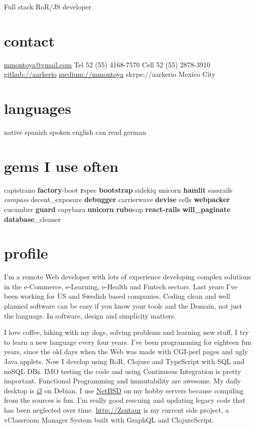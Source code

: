 \documentclass[]{k-cv}
\begin{document}
       {Full stack RoR/JS developer}

\begin{aside}
  \section{contact}
    \href{mailto:mmontoya@gmail.com}{mmontoya@gmail.com}
    Tel  52 (55) 4168-7570
    Cell 52 (55) 2878-3910
    \href{http://github.com/aarkerio}{github://aarkerio}
    \href{https://medium.com/@mmontoya}{medium://mmontoya}
    skype://aarkerio
    Mexico City
  \section{languages}
    native spanish
	  spoken english
	  can read german

  \section{gems I use often}
    capistrano \textbf{factory}-boot \textbf{r}spec
    \textbf{bootstrap} sidekiq unicorn \textbf{hamlit} sassrails \textit{compass}
    decent\_exposure \textbf{debugger} carrierwave \textbf{devise} cells \textbf{webpacker}
    cucumber \textbf{guard} capybara \textbf{unicorn}
    \textbf{rubo}cop \textbf{react-rails}
    \textbf{will\_paginate} \textbf{database}\_cleaner

\end{aside}

\section{profile}

I'm a remote Web developer with lots of experience developing complex solutions in the e-Commerce, e-Learning, e-Health and Fintech sectors.
Last years I've been working for US and Swedish based companies. Coding clean and well planned software can be easy if you know your tools and the Domain,
not just the language. In software, design and simplicity matters.

I love coffee, hiking with my dogs, solving problems and learning new stuff, I try to learn a new language every four years. I've been
programming for eighteen fun years, since the old days when the Web was made with CGI-perl pages and ugly Java applets. Now I develop using RoR, Clojure and TypeScript with SQL and
noSQL DBs. IMO testing the code and using Continuous Integration is pretty important. Functional Programming and immutability are awesome. My daily desktop is \href{https://i3wm.org/}{i3} on Debian. I use \href{http://netbsd.org}{NetBSD} on my hobby servers because compiling from the sources is fun. I'm really good rescuing and updating legacy code that has been neglected over time. \href{https://github.com/aarkerio/ZentaurLMS/blob/master/src/cljs/zentaur/reframe/tests/events.cljs}{http://Zentaur}
is my current side project, a vClassroom Manager System built with GraphQL and ClojureScript.
\end{document}
